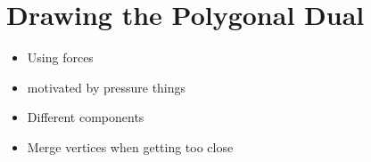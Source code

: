 \section{Drawing the Polygonal Dual}
\label{sect:drawing-the-polygonal-dual}

\begin{itemize}
	\item Using forces
	\item motivated by pressure things
	\item Different components
	\item Merge vertices when getting too close
\end{itemize}
